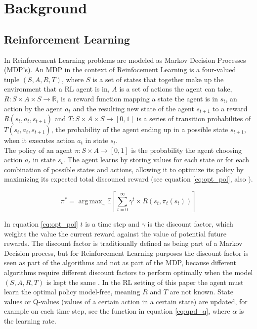 
\section{Background}

\subsection{Reinforcement Learning}

In Reinforcement Learning problems are modeled as Markov Decision Processes (MDP's). An MDP in the context of Reinfocement Learning
is a four-valued tuple $(S,A,R,T)$, where $S$ is a set of states that together make up the environment that a RL agent is in,
 $A$ is a set of actions the agent can take, $R: S \times A \times S \rightarrow \mathbb{R}$, is a reward function mapping a state the agent is in $s_t$,
 an action by the agent $a_t$ and the resulting new state of the agent $s_{t+1}$ to a reward $R(s_t,a_t,s_{t+1})$
 and $T: S \times A \times S \rightarrow [0,1]$ is a series of transition probabilites of $T(s_t,a_t,s_{t+1})$, the probability of the agent
 ending up in a possible state $s_{t+1}$, when it executes action $a_t$ in state $s_t$. \\
 The policy of an agent $\pi: S \times A \rightarrow [0,1]$ is the probability the agent choosing action $a_t$ in state $s_t$. The agent learns by storing values for each
 state or for each combination of possible states and actions, allowing it to optimize its policy by maximizing its expected total discouned reward
 (see equation \ref{eq:opt_pol}, also \cite{zimmer2016neural}).

\begin{equation}
\label{eq:opt_pol}
\pi^* = \operatorname{arg\,max}_{\pi} \mathbb{E}\left [ \sum_{t = 0}^{\infty}\gamma^{t} \times R(s_t,\pi_t(s_t))\right ]
\end{equation}

In equation \ref{eq:opt_pol} $t$ is a time step and $\gamma$ is the discount factor, which weights the value the current reward against the value of potential future rewards.
The discount factor is traditionally defined as being part of a Markov Decision process, but for Reinforcement Learning purposes the discount factor is seen as part
of the algorithms and not as part of the MDP, because different algorithms require different discount factors to perform optimally when the model
$(S,A,R,T)$ is kept the same \cite{van2007reinforcement}. In the RL setting of this paper the agent must learn the optimal policy model-free, meaning $R$ and $T$ are not known.
State values or Q-values (values of a certain action in a certain state) are updated, for example on each time step, see the function in equation \ref{eq:upd_q}, where $\alpha$ is the learning rate.

